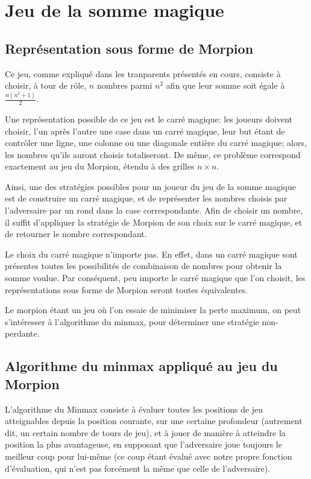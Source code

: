 \section{Jeu de la somme magique}

\subsection{Représentation sous forme de Morpion}
Ce jeu, comme expliqué dans les tranparents présentés en cours,
consiste à choisir, à tour de rôle, $n$ nombres parmi $n^2$ afin que
leur somme soit égale à $\frac{n(n^2+1)}{2}$.

Une représentation possible de ce jeu est le carré magique: les
joueurs doivent choisir, l'un après l'autre une case dans un carré
magique, leur but étant de contrôler une ligne, une colonne ou une
diagonale entière du carré magique; alors, les nombres qu'ils auront
choisis totaliseront.  De même, ce problème correspond exactement au
jeu du Morpion, étendu à des grilles $n \times n$.

Ainsi, une des stratégies possibles pour un joueur du jeu de la somme
magique est de construire un carré magique, et de représenter les
nombres choisis par l'adversaire par un rond dans la case
correspondante. Afin de choisir un nombre, il suffit d'appliquer la
stratégie de Morpion de son choix sur le carré magique, et de
retourner le nombre correspondant.

Le choix du carré magique n'importe pas. En effet, dans un carré
magique sont présentes toutes les possibilités de combinaison de
nombres pour obtenir la somme voulue. Par conséquent, peu importe le
carré magique que l'on choisit, les représentations sous forme de
Morpion seront toutes équivalentes.

Le morpion étant un jeu où l'on essaie de minimiser la perte maximum,
on peut s'intéresser à l'algorithme du minmax, pour déterminer une
stratégie non-perdante.

\subsection{Algorithme du minmax appliqué au jeu du Morpion}
L'algorithme du Minmax consiste à évaluer toutes les positions de jeu
atteignables depuis la position courante, sur une certaine profondeur
(autrement dit, un certain nombre de tours de jeu), et à jouer de
manière à atteindre la position la plus avantageuse, en supposant que
l'adversaire joue toujours le meilleur coup pour lui-même (ce coup
étant évalué avec notre propre fonction d'évaluation, qui n'est pas
forcément la même que celle de l'adversaire).


